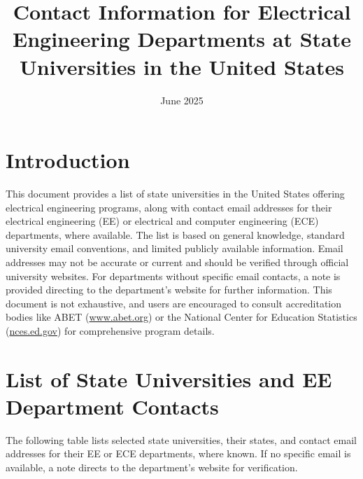 \documentclass[12pt]{article}
\title{Contact Information for Electrical Engineering Departments at State Universities in the United States}
\author{}
\date{June 2025}
\begin{document}
\maketitle

\section*{Introduction}
This document provides a list of state universities in the United States offering electrical engineering programs, along with contact email addresses for their electrical engineering (EE) or electrical and computer engineering (ECE) departments, where available. The list is based on general knowledge, standard university email conventions, and limited publicly available information. Email addresses may not be accurate or current and should be verified through official university websites. For departments without specific email contacts, a note is provided directing to the department’s website for further information. This document is not exhaustive, and users are encouraged to consult accreditation bodies like ABET (\url{www.abet.org}) or the National Center for Education Statistics (\url{nces.ed.gov}) for comprehensive program details.

\section*{List of State Universities and EE Department Contacts}
The following table lists selected state universities, their states, and contact email addresses for their EE or ECE departments, where known. If no specific email is available, a note directs to the department’s website for verification.
\end{document}
